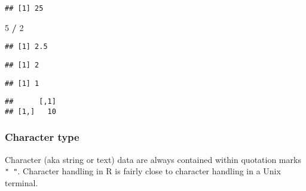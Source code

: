 \documentclass[]{article}
\newenvironment{Shaded}{\begin{snugshade}}{\end{snugshade}}
\newcommand{\DecValTok}[1]{\textcolor[rgb]{0.00,0.00,0.81}{#1}}
\newcommand{\StringTok}[1]{\textcolor[rgb]{0.31,0.60,0.02}{#1}}
\newcommand{\OperatorTok}[1]{\textcolor[rgb]{0.81,0.36,0.00}{\textbf{#1}}}
\begin{document}
\begin{verbatim}
## [1] 25
\end{verbatim}

\begin{Shaded}
\begin{Highlighting}[]
\DecValTok{5} \OperatorTok{/}\StringTok{ }\DecValTok{2}  
\end{Highlighting}
\end{Shaded}

\begin{verbatim}
## [1] 2.5
\end{verbatim}

\begin{Shaded}
\end{Shaded}

\begin{verbatim}
## [1] 2
\end{verbatim}

\begin{Shaded}
\end{Shaded}

\begin{verbatim}
## [1] 1
\end{verbatim}

\begin{Shaded}
\end{Shaded}

\begin{verbatim}
##      [,1]
## [1,]   10
\end{verbatim}

\subsubsection{Character type}\label{character-type}

Character (aka string or text) data are always contained within
quotation marks \texttt{"\ "}. Character handling in R is fairly close
to character handling in a Unix terminal.
\end{document}
